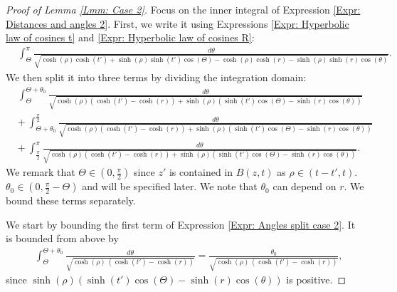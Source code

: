 \documentclass[11pt,twoside,reqno]{amsart} \usepackage{a4wide} \usepackage[T1]{fontenc} \usepackage[utf8]{inputenc} \usepackage{soul}  \usepackage{amsmath} \usepackage{amsfonts} \usepackage{amssymb} \usepackage{mathtools} \usepackage{amsthm} \usepackage{xcolor} \usepackage{graphicx} \usepackage{hyperref} \usepackage{standalone} \usepackage{esint} \usepackage{comment} \usepackage[left=2.3cm,top=3cm,right=2.3cm]{geometry} \usepackage{bm} \usepackage{svg} \usepackage{float} \numberwithin{equation}{section} \theoremstyle{plain} \newtheorem{thm}{Theorem}[section] \newtheorem{theorem}[thm]{Theorem} \newtheorem*{theorem*}{Theorem}\newtheorem{conj}[thm]{Conjecture} \newtheorem{lemma}[thm]{Lemma} \newtheorem{prop}[thm]{Proposition} \newtheorem{proposition}[thm]{Proposition} \newtheorem{cor}[thm]{Corollary} \newtheorem{question}[thm]{Question} \newtheorem{corollary}[thm]{Corollary} \newtheorem{assumption}[thm]{Assumption} \theoremstyle{definition} \newtheorem{defn}[thm]{Definition} \newtheorem{choice}[thm]{Choice} \newtheorem{definition}[thm]{Definition} \newtheorem{ex}[thm]{Example} \newtheorem{notation}[thm]{Notation} \newtheorem*{ack}{Acknowledgements} \theoremstyle{remark} \newtheorem{remark}[thm]{Remark} \newtheorem{bigremark}[thm]{Remark} \usepackage{xcolor} \newcommand{\red}[1]{ {\color{Red}#1} } \newcommand{\blue}[1]{ {\color{Blue}#1} } \author{Kai Hippi} \address{Aalto University, Espoo, Finland} \email{kai.hippi@aalto.fi}
\begin{document}
\begin{proof}[Proof of Lemma \ref{Lmm: Case 2}]
Focus on the inner integral of Expression \eqref{Expr: Distances and angles 2}. First, we write it using Expressions \eqref{Expr: Hyperbolic law of cosines t} and \eqref{Expr: Hyperbolic law of cosines R}:
\begin{align*}
	&
	\int_{\Theta}^{\pi} \frac{d \theta}{ \sqrt{ \cosh( \rho ) \cosh( t' ) + \sinh( \rho ) \sinh( t' ) \cos( \Theta ) - \cosh( \rho ) \cosh( r ) - \sinh( \rho ) \sinh( r ) \cos( \theta ) } }.
\end{align*}
We then split it into three terms by dividing the integration domain:
\begin{align}
	&
	\nonumber
	\int_{\Theta}^{ \Theta + \theta_{0} } \frac{ d\theta }{ \sqrt{ \cosh( \rho )(  \cosh( t' ) - \cosh( r )  ) + \sinh( \rho )( \sinh( t' ) \cos( \Theta ) - \sinh( r ) \cos( \theta ) ) } }
	\\
	& + \
	\nonumber
	\int_{\Theta + \theta_{0}}^{ \frac{\pi}{2} } \frac{ d\theta }{ \sqrt{ \cosh( \rho )(  \cosh( t' ) - \cosh( r )  ) + \sinh( \rho )( \sinh( t' ) \cos( \Theta ) - \sinh( r ) \cos( \theta ) ) } }
	\\
	& + \
	\label{Expr: Angles split case 2}
	\int_{ \frac{\pi}{2} }^{ \pi } \frac{ d\theta }{ \sqrt{ \cosh( \rho )(  \cosh( t' ) - \cosh( r )  ) + \sinh( \rho )( \sinh( t' ) \cos( \Theta ) - \sinh( r ) \cos( \theta ) ) } }.
\end{align}
We remark that $ \Theta \in ( 0, \frac{\pi}{2} ) $ since $ z' $ is contained in $ B( z,t ) $ as $ \rho \in ( t-t', t ) $. $ \theta_{0} \in ( 0, \frac{\pi}{2} - \Theta ) $ and will be specified later. We note that $ \theta_{0} $ can depend on $ r $. We bound these terms separately.

We start by bounding the first term of Expression \eqref{Expr: Angles split case 2}. It is bounded from above by
\begin{align*}
	&
	\int_{\Theta}^{\Theta + \theta_{0}} \frac{ d\theta }{ \sqrt{ \cosh( \rho )\, ( \cosh( t' ) - \cosh( r ) ) } } = \frac{ \theta_{0} }{ \sqrt{ \cosh( \rho )\, ( \cosh( t' ) - \cosh( r ) ) } },
\end{align*}
since $ \sinh( \rho )( \sinh( t' ) \cos( \Theta ) - \sinh( r ) \cos( \theta ) ) $ is positive.


\end{proof}
\end{document}
